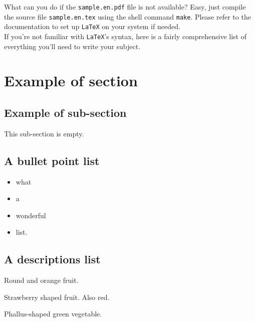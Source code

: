 \documentclass{42-en}
\begin{document}
    What can you do if the \texttt{sample.en.pdf} file is not available?
    Easy, just compile the source file \texttt{sample.en.tex} using
    the shell command \texttt{make}. Please refer to the documentation
    to set up \texttt{LaTeX} on your system if needed.\\

    If you're not familiar with \texttt{LaTeX}'s syntax, here is a
    fairly comprehensive list of everything you'll need to write your
    subject.\\


    \section{Example of section}


        \subsection{Example of sub-section}

           This sub-section is empty.


        \newpage


        \subsection{A bullet point list}

            \begin{itemize}\itemsep1pt
                \item what
                \item a
                \item wonderful
                \item list.\\
            \end{itemize}


        \subsection{A descriptions list}

            \begin{description}\itemsep3pt
                \item [Orange:] Round and orange fruit.
                \item [Strawberry:] Strawberry shaped fruit. Also red.
                \item [Cucumber:] Phallus-shaped green vegetable.\\
            \end{description}
\end{document}
